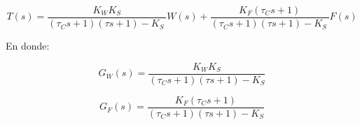 \documentclass[12pt,letterpaper]{article}     %
\begin{document}
\begin{equation}
T \left(s\right)=\frac{K_W K_S }{\left(\tau  _C s+1\right)\left(\tau s+1\right)-K_{S\;} }W\left(s\right)+\frac{K_F \left(\tau  _C s+1\right)}{\left(\tau  _C s+1\right)\left(\tau s+1\right)-K_{S\;} }F\left(s\right)
\end{equation}

En donde:

\begin{equation}
G_W \left(s\right)=\frac{K_W K_S }{\left(\tau_C s+1\right)\left(\tau s+1\right)-K_S }
\end{equation}

\begin{equation}
G_F \left(s\right)=\frac{K_F \left(\tau  _C s+1\right)}{\left(\tau  _C s+1\right)\left(\tau s+1\right)-K_S }
\end{equation}








\end{document}
